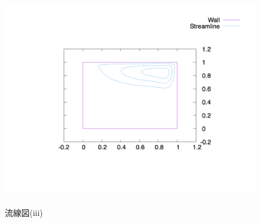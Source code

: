 \documentclass[upLaTeX,a4paper]{jsarticle}
\begin{document}
\begin{figure}[H]
  \centering
  \includegraphics[height=9.5cm]{outputs/img/stream_line_re500.png}
  \caption{流線図(iii)}
  \label{fig:velocity_vector_re500}
\end{figure}
\end{document}
